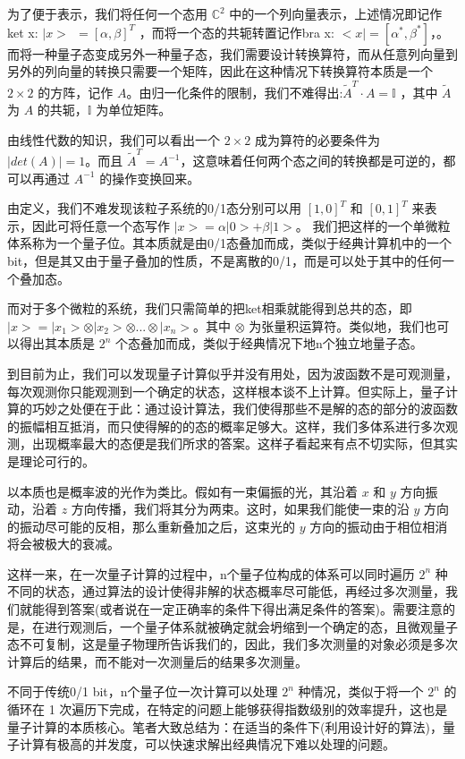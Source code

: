 \documentclass[fontset=windows]{article}
\begin{document}
为了便于表示，我们将任何一个态用 $\mathbb{C} ^2$ 中的一个列向量表示，上述情况即记作ket x: $|x>  \ \   = [\alpha,\beta]^T$ ，而将一个态的共轭转置记作bra x: $<x| = [\alpha^*,\beta^*]$，。而将一种量子态变成另外一种量子态，我们需要设计转换算符，而从任意列向量到另外的列向量的转换只需要一个矩阵，因此在这种情况下转换算符本质是一个 $2 \times 2$ 的方阵，记作 $A$。由归一化条件的限制，我们不难得出:$\tilde A^{T} \cdot A = \mathbb{I}$ ，其中 $\tilde {A}$ 为 $A$ 的共轭，$\mathbb{I}$ 为单位矩阵。

由线性代数的知识，我们可以看出一个 $2 \times 2$ 成为算符的必要条件为 $|det(A)| = 1$。而且 $\tilde A^{T} = A ^{-1}$，这意味着任何两个态之间的转换都是可逆的，都可以再通过 $A^{-1}$ 的操作变换回来。

由定义，我们不难发现该粒子系统的0/1态分别可以用 $[1,0]^T$ 和 $[0,1]^T$ 来表示，因此可将任意一个态写作 $|x> = \alpha |0> + \beta |1>$。 我们把这样的一个单微粒体系称为一个量子位。其本质就是由0/1态叠加而成，类似于经典计算机中的一个bit，但是其又由于量子叠加的性质，不是离散的0/1，而是可以处于其中的任何一个叠加态。

而对于多个微粒的系统，我们只需简单的把ket相乘就能得到总共的态，即 $|x> = |x_1> \otimes |x_2> \otimes ... \otimes |x_n>$。其中 $\otimes$ 为张量积运算符。类似地，我们也可以得出其本质是 $2^n$ 个态叠加而成，类似于经典情况下地n个独立地量子态。

到目前为止，我们可以发现量子计算似乎并没有用处，因为波函数不是可观测量，每次观测你只能观测到一个确定的状态，这样根本谈不上计算。但实际上，量子计算的巧妙之处便在于此：通过设计算法，我们使得那些不是解的态的部分的波函数的振幅相互抵消，而只使得解的的态的概率足够大。这样，我们多体系进行多次观测，出现概率最大的态便是我们所求的答案。这样子看起来有点不切实际，但其实是理论可行的。

以本质也是概率波的光作为类比。假如有一束偏振的光，其沿着 $x$ 和 $y$ 方向振动，沿着 $z$ 方向传播，我们将其分为两束。这时，如果我们能使一束的沿 $y$ 方向的振动尽可能的反相，那么重新叠加之后，这束光的 $y$ 方向的振动由于相位相消将会被极大的衰减。

这样一来，在一次量子计算的过程中，n个量子位构成的体系可以同时遍历 $2^n$ 种不同的状态，通过算法的设计使得非解的状态概率尽可能低，再经过多次测量，我们就能得到答案(或者说在一定正确率的条件下得出满足条件的答案)。需要注意的是，在进行观测后，一个量子体系就被确定就会坍缩到一个确定的态，且微观量子态不可复制，这是量子物理所告诉我们的，因此，我们多次测量的对象必须是多次计算后的结果，而不能对一次测量后的结果多次测量。

不同于传统0/1 bit，n个量子位一次计算可以处理 $2^n$ 种情况，类似于将一个 $2^n$ 的循环在 1 次遍历下完成，在特定的问题上能够获得指数级别的效率提升，这也是量子计算的本质核心。笔者大致总结为：在适当的条件下(利用设计好的算法)，量子计算有极高的并发度，可以快速求解出经典情况下难以处理的问题。
\end{document}
